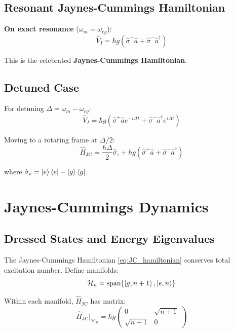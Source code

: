 \documentclass[12pt,a4paper]{article}
\begin{document}
\subsection{Resonant Jaynes-Cummings Hamiltonian}

\textbf{On exact resonance} ($\omega_m = \omega_{eg}$):
\begin{equation}
\hat{V}_I = \hbar g\left(\hat{\sigma}^+ \hat{a} + \hat{\sigma}^- \hat{a}^\dagger\right) \label{eq:JC_hamiltonian}
\end{equation}

This is the celebrated \textbf{Jaynes-Cummings Hamiltonian}.

\subsection{Detuned Case}

For detuning $\Delta = \omega_m - \omega_{eg}$:
\begin{equation}
\hat{V}_I = \hbar g\left(\hat{\sigma}^+ \hat{a} e^{-i\Delta t} + \hat{\sigma}^- \hat{a}^\dagger e^{i\Delta t}\right) \label{eq:JC_detuned}
\end{equation}

Moving to a rotating frame at $\Delta/2$:
\begin{equation}
\hat{H}_{\text{JC}} = \frac{\hbar\Delta}{2}\hat{\sigma}_z + \hbar g\left(\hat{\sigma}^+ \hat{a} + \hat{\sigma}^- \hat{a}^\dagger\right) \label{eq:JC_full}
\end{equation}

where $\hat{\sigma}_z = \ket{e}\bra{e} - \ket{g}\bra{g}$.

\section{Jaynes-Cummings Dynamics}

\subsection{Dressed States and Energy Eigenvalues}

The Jaynes-Cummings Hamiltonian \eqref{eq:JC_hamiltonian} conserves total excitation number. Define manifolds:
\begin{equation}
\mathcal{H}_n = \text{span}\{\ket{g, n+1}, \ket{e, n}\}
\end{equation}

Within each manifold, $\hat{H}_{\text{JC}}$ has matrix:
\begin{equation}
\hat{H}_{\text{JC}}|_{\mathcal{H}_n} = \hbar g \begin{pmatrix}
0 & \sqrt{n+1}\\
\sqrt{n+1} & 0
\end{pmatrix}
\end{equation}
\end{document}
